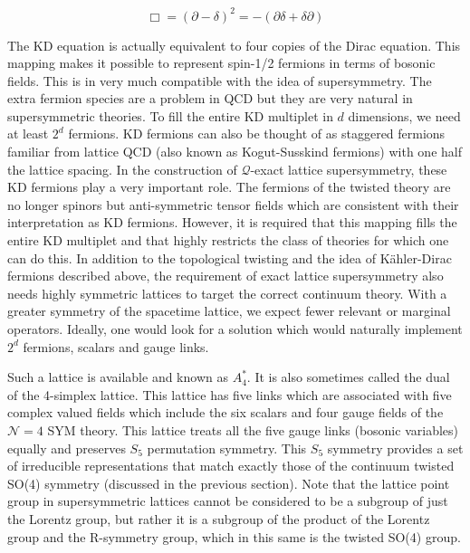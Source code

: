\begin{equation}
\Box = (\partial - \delta)^{2} = -(\partial \delta + \delta \partial)
\end{equation}

The KD equation is actually equivalent to four copies of the Dirac equation. This mapping makes it possible to represent 
spin-1/2 fermions in terms of bosonic fields. This is in very much compatible with the idea of supersymmetry. The 
extra fermion species are a problem in QCD but they are very natural in supersymmetric theories. To fill the entire 
KD multiplet in $d$ dimensions,
we need at least $2^d$ fermions. KD fermions can also be thought of as staggered fermions familiar from lattice 
QCD (also known as Kogut-Susskind fermions) with one half the lattice spacing. 
In the construction of $\mathcal{Q}$-exact lattice supersymmetry, these KD fermions play a very important role. 
The fermions of the twisted theory are no longer spinors but anti-symmetric tensor fields which are consistent with 
their interpretation as KD fermions. However, it is required that this mapping fills the entire KD multiplet and that 
highly restricts the class of theories for which one can do this. 
In addition to the topological twisting and the idea of K\"{a}hler-Dirac fermions described above, the requirement of 
exact lattice supersymmetry also needs highly symmetric lattices to target the correct continuum theory. 
With a greater symmetry of the spacetime lattice, we expect fewer relevant or marginal operators. 
Ideally, one would look for a solution which would naturally implement $2^{d}$ fermions, scalars and gauge links. 

Such a lattice is available and known as $A_{4}^{*}$.
It is also sometimes called the dual of the 4-simplex lattice.
This lattice has five links which are associated with five complex valued fields which include the six scalars and four gauge 
fields of the $\mathcal{N}=4$ SYM theory. This lattice treats all the five gauge links (bosonic variables) equally 
and preserves $S_{5}$ permutation symmetry. This $S_{5}$ symmetry provides a set of irreducible representations 
that match exactly those of the continuum twisted SO(4) symmetry (discussed in the previous section). Note that the 
lattice point group in supersymmetric lattices cannot be considered to be a subgroup of just the Lorentz group, 
but rather it is a subgroup of the product of the Lorentz group and the R-symmetry group, which in this same is the 
twisted SO(4) group. 



